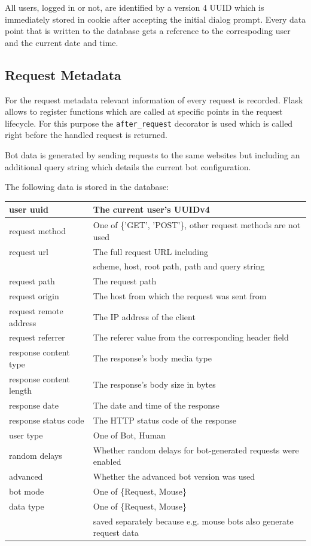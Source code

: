 \documentclass[
    fontsize=12pt,
    headings=small,
    parskip=half,           %
    bibliography=totoc,
    numbers=noenddot,       %
    open=any,               %
    final,                   %
    table
]{scrreprt}
\begin{document}
All users, logged in or not, are identified by a version 4 UUID which is immediately stored in cookie after accepting the initial dialog prompt. Every data point that is written to the database gets a reference to the correspoding user and the current date and time.

\subsection{Request Metadata}

For the request metadata relevant information of every request is recorded. Flask allows to register functions which are called at specific points in the request lifecycle. For this purpose the \lstinline{after_request} decorator is used which is called right before the handled request is returned.

Bot data is generated by sending requests to the same websites but including an additional query string which details the current bot configuration.

The following data is stored in the database:

\begin{table}[]
\begin{tabular}{|l|l|}
\hline
user uuid & The current user's UUIDv4 \\ \hline
request method & One of \{'GET', 'POST'\}, other request methods are not used \\ \hline
request url & The full request URL including \\ & scheme, host, root path, path and query string \\ \hline
request path & The request path \\ \hline
request origin & The host from which the request was sent from \\ \hline
request remote address & The IP address of the client \\ \hline
request referrer & The referer value from the corresponding header field \\ \hline
response content type & The response's body media type \\ \hline
response content length & The response's body size in bytes \\ \hline
response date & The date and time of the response \\ \hline
response status code & The HTTP status code of the response \\ \hline
user type & One of {Bot, Human} \\ \hline
random delays & Whether random delays for bot-generated requests were enabled \\ \hline
advanced & Whether the advanced bot version was used \\ \hline
bot mode & One of \{Request, Mouse\} \\ \hline
data type & One of \{Request, Mouse\} \\ & saved separately because e.g. mouse bots also generate request data \\ \hline

\end{tabular}
\end{table}
\end{document}
